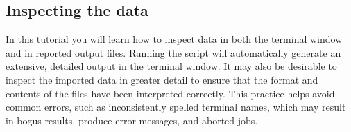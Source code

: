 \documentclass[]{article}
\begin{document}
\subsection{Inspecting the data}
\label{subsec:Inspecting}

In this tutorial you will learn how to inspect data in both the terminal window and 
in reported output files. Running the script will automatically generate an extensive, 
detailed output in the terminal window. It may also be desirable to inspect the 
imported data in greater detail to ensure that the format and contents of the files 
have been interpreted correctly. This practice helps avoid common errors, such 
as inconsistently spelled terminal names, which may result in bogus results, 
produce error messages, and aborted jobs.
\end{document}
